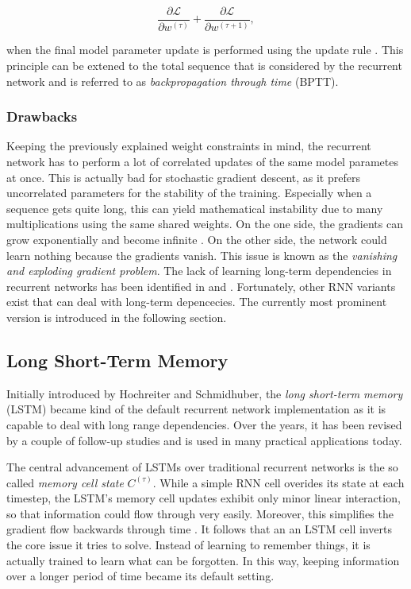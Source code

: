 \begin{equation} \label{eq:rnn}
	\frac{\partial \mathcal{L}}{\partial w^{(\tau)}} + \frac{\partial \mathcal{L}}{\partial w^{(\tau+1)}} ,
\end{equation}

when the final model parameter update is performed using the update rule \parencite{rnn-bptt}. This principle can be extened to the total sequence that is considered by the recurrent network and is referred to as \textit{backpropagation through time} (BPTT).

\subsubsection{Drawbacks} \label{sec:rnn-drawbacks}

Keeping the previously explained weight constraints in mind, the recurrent network has to perform a lot of correlated updates of the same model parametes at once. This is actually bad for stochastic gradient descent, as it prefers uncorrelated parameters for the stability of the training. Especially when a sequence gets quite long, this can yield mathematical instability due to many multiplications using the same shared weights. On the one side, the gradients can grow exponentially and become infinite \parencite{lstm}. On the other side, the network could learn nothing because the gradients vanish. This issue is known as the \textit{vanishing and exploding gradient problem}. The lack of learning long-term dependencies in recurrent networks has been identified in \parencite{hochreiter} and \parencite{rnn-vanish}. Fortunately, other RNN variants exist that can deal with long-term depencecies. The currently most prominent version is introduced in the following section.


\subsection{Long Short-Term Memory}

Initially introduced by Hochreiter and Schmidhuber, the \textit{long short-term memory} (LSTM) became kind of the default recurrent network implementation as it is capable to deal with long range dependencies. Over the years, it has been revised by a couple of follow-up studies \parencite{lstm_peep} \parencite{lstm_v2} and is used in many practical applications today.

The central advancement of LSTMs over traditional recurrent networks is the so called \textit{memory cell state} $C^{(\tau)}$. While a simple RNN cell overides its state at each timestep, the LSTM's memory cell updates exhibit only minor linear interaction, so that information could flow through very easily. Moreover, this simplifies the gradient flow backwards through time \parencite{rnn-batchnorm}. It follows that an an LSTM cell inverts the core issue it tries to solve. Instead of learning to remember things, it is actually trained to learn what can be forgotten. In this way, keeping information over a longer period of time became its default setting.

